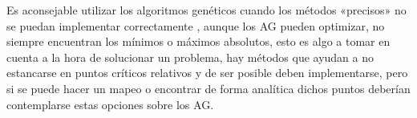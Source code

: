 \documentclass[12pt,letterpaper]{article}
\begin{document}
Es aconsejable utilizar los algoritmos genéticos cuando los métodos «precisos» no se puedan implementar correctamente , aunque los AG pueden optimizar, no siempre encuentran los mínimos o máximos absolutos, esto es algo a tomar en cuenta a la hora de solucionar un problema, hay métodos que ayudan a no estancarse en puntos críticos relativos y de ser posible deben implementarse, pero si se puede hacer un mapeo o encontrar de forma analítica dichos puntos deberían contemplarse estas opciones sobre los AG. 



\end{document}

